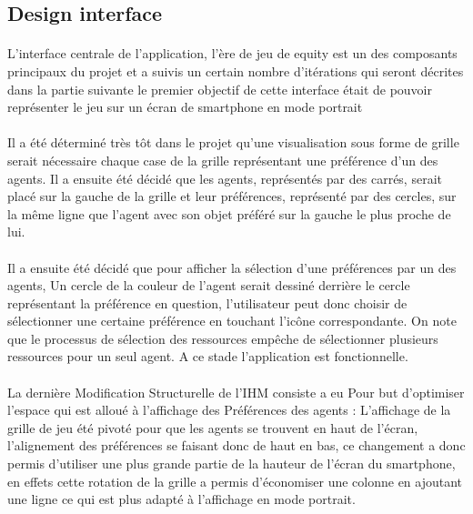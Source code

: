 \documentclass[a4paper, 10pt]{article}
\begin{document}
	\subsection{Design interface}
	
\paragraph{}
L’interface centrale de  l’application, l’ère de jeu de equity est un des composants principaux du projet et a suivis un certain nombre d'itérations qui seront décrites dans la partie suivante le premier objectif de cette interface était de pouvoir représenter le jeu sur un écran de smartphone en mode portrait
\paragraph{}
Il a été déterminé très tôt dans le projet qu’une visualisation sous forme de grille serait nécessaire chaque case de la grille représentant une préférence d’un des agents. Il a ensuite été décidé que les agents, représentés par des carrés, serait placé sur la gauche de la grille et leur préférences, représenté par des cercles, sur la même ligne que l’agent avec son objet préféré sur la gauche le plus proche de lui.
\paragraph{}
Il a ensuite été décidé que pour afficher la sélection d’une préférences par un des agents, Un cercle de la couleur de l’agent serait dessiné derrière le cercle représentant la préférence en question, l'utilisateur peut donc choisir de sélectionner une certaine préférence en touchant l'icône correspondante. On note que le processus de sélection des ressources empêche de sélectionner plusieurs ressources pour un seul agent. A ce stade l’application est fonctionnelle.
\paragraph{}
La dernière Modification Structurelle de l’IHM consiste a eu Pour but d’optimiser l’espace qui est alloué  à l’affichage des Préférences des agents : L'affichage de la grille de jeu été pivoté pour que les agents se trouvent en haut de l'écran, l'alignement des préférences se faisant donc de haut en bas, ce changement a donc permis d'utiliser une plus grande partie de la hauteur de l'écran du smartphone, en effets cette rotation de la grille a permis d'économiser une colonne en ajoutant une ligne ce qui est plus adapté à l’affichage en mode portrait.
\end{document}
